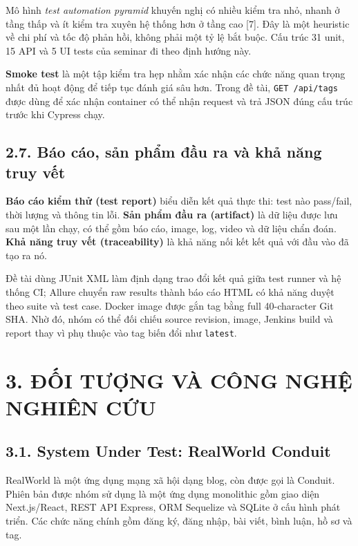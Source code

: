 \documentclass[
  vietnamese,
  12pt,
  a4paper,
  oneside]{report}
\begin{document}
Mô hình \emph{test automation pyramid} khuyến nghị có nhiều kiểm tra
nhỏ, nhanh ở tầng thấp và ít kiểm tra xuyên hệ thống hơn ở tầng cao
{[}7{]}. Đây là một heuristic về chi phí và tốc độ phản hồi, không phải
một tỷ lệ bắt buộc. Cấu trúc 31 unit, 15 API và 5 UI tests của seminar
đi theo định hướng này.

\textbf{Smoke test} là một tập kiểm tra hẹp nhằm xác nhận các chức năng
quan trọng nhất đủ hoạt động để tiếp tục đánh giá sâu hơn. Trong đề tài,
\texttt{GET\ /api/tags} được dùng để xác nhận container có thể nhận
request và trả JSON đúng cấu trúc trước khi Cypress chạy.

\section{2.7. Báo cáo, sản phẩm đầu ra và khả năng truy
vết}\label{27-buxe1o-cuxe1o-sux1ea3n-phux1ea9m-ux111ux1ea7u-ra-vuxe0-khux1ea3-nux103ng-truy-vux1ebft}

\textbf{Báo cáo kiểm thử (test report)} biểu diễn kết quả thực thi: test
nào pass/fail, thời lượng và thông tin lỗi. \textbf{Sản phẩm đầu ra
(artifact)} là dữ liệu được lưu sau một lần chạy, có thể gồm báo cáo,
image, log, video và dữ liệu chẩn đoán. \textbf{Khả năng truy vết
(traceability)} là khả năng nối kết kết quả với đầu vào đã tạo ra nó.

Đề tài dùng JUnit XML làm định dạng trao đổi kết quả giữa test runner và
hệ thống CI; Allure chuyển raw results thành báo cáo HTML có khả năng
duyệt theo suite và test case. Docker image được gắn tag bằng full
40-character Git SHA. Nhờ đó, nhóm có thể đối chiếu source revision,
image, Jenkins build và report thay vì phụ thuộc vào tag biến đổi như
\texttt{latest}.

\chapter{3. ĐỐI TƯỢNG VÀ CÔNG NGHỆ NGHIÊN
CỨU}\label{3-ux111ux1ed1i-tux1b0ux1ee3ng-vuxe0-cuxf4ng-nghux1ec7-nghiuxean-cux1ee9u}

\section{3.1. System Under Test: RealWorld
Conduit}\label{31-system-under-test-realworld-conduit}

RealWorld là một ứng dụng mạng xã hội dạng blog, còn được gọi là
Conduit. Phiên bản được nhóm sử dụng là một ứng dụng monolithic gồm giao
diện Next.js/React, REST API Express, ORM Sequelize và SQLite ở cấu hình
phát triển. Các chức năng chính gồm đăng ký, đăng nhập, bài viết, bình
luận, hồ sơ và tag.
\end{document}
